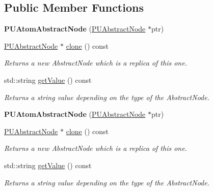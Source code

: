 \subsection*{Public Member Functions}
\begin{DoxyCompactItemize}
\item 
\mbox{\label{classPUAtomAbstractNode_a55e634996bd367f748a52f3cc0a2d50d}} 
{\bfseries P\+U\+Atom\+Abstract\+Node} (\hyperlink{classPUAbstractNode}{P\+U\+Abstract\+Node} $\ast$ptr)
\item 
\mbox{\label{classPUAtomAbstractNode_a3765d582168d1b13e2a4c5126fd0074d}} 
\hyperlink{classPUAbstractNode}{P\+U\+Abstract\+Node} $\ast$ \hyperlink{classPUAtomAbstractNode_a3765d582168d1b13e2a4c5126fd0074d}{clone} () const
\begin{DoxyCompactList}\small\item\em Returns a new Abstract\+Node which is a replica of this one. \end{DoxyCompactList}\item 
\mbox{\label{classPUAtomAbstractNode_a298e203c563f8ec8c9ed4fa4410458df}} 
std\+::string \hyperlink{classPUAtomAbstractNode_a298e203c563f8ec8c9ed4fa4410458df}{get\+Value} () const
\begin{DoxyCompactList}\small\item\em Returns a string value depending on the type of the Abstract\+Node. \end{DoxyCompactList}\item 
\mbox{\label{classPUAtomAbstractNode_a55e634996bd367f748a52f3cc0a2d50d}} 
{\bfseries P\+U\+Atom\+Abstract\+Node} (\hyperlink{classPUAbstractNode}{P\+U\+Abstract\+Node} $\ast$ptr)
\item 
\mbox{\label{classPUAtomAbstractNode_a04726d0fff11565300cd2ad7cb4a26d0}} 
\hyperlink{classPUAbstractNode}{P\+U\+Abstract\+Node} $\ast$ \hyperlink{classPUAtomAbstractNode_a04726d0fff11565300cd2ad7cb4a26d0}{clone} () const
\begin{DoxyCompactList}\small\item\em Returns a new Abstract\+Node which is a replica of this one. \end{DoxyCompactList}\item 
\mbox{\label{classPUAtomAbstractNode_a298e203c563f8ec8c9ed4fa4410458df}} 
std\+::string \hyperlink{classPUAtomAbstractNode_a298e203c563f8ec8c9ed4fa4410458df}{get\+Value} () const
\begin{DoxyCompactList}\small\item\em Returns a string value depending on the type of the Abstract\+Node. \end{DoxyCompactList}\end{DoxyCompactItemize}
